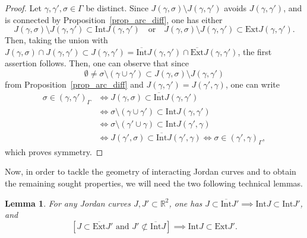 \documentclass[a4paper, 11pt]{article} %
\theoremstyle{plain}
\newtheorem{lemma}[theorem]{Lemma}
\newcommand{\Int}{\mathrm{Int}}
\newcommand{\clInt}{\overline{\mathrm{Int}}}
\newcommand{\Ext}{\mathrm{Ext}}
\newcommand{\clExt}{\overline{\mathrm{Ext}}}
\newcommand{\R}{\mathbb{R}}
\newcommand{\1}{\mathds 1}
\numberwithin{equation}{section}
\begin{document}
\begin{proof}
    Let $\gamma,\gamma',\sigma\in\Gamma$ be distinct. Since $J(\gamma,\sigma)\setminus J(\gamma,\gamma')$ avoids $J(\gamma,\gamma')$, and is connected by Proposition~\ref{prop_arc_diff}, one has either
        \[J(\gamma,\sigma)\setminus J(\gamma,\gamma')\subset \Int J(\gamma,\gamma')\quad\text{or}\quad J(\gamma,\sigma)\setminus J(\gamma,\gamma')\subset\Ext J(\gamma,\gamma').\]
    Then, taking the union with $J(\gamma,\sigma)\cap J(\gamma,\gamma')\subset J(\gamma,\gamma')=\clInt J(\gamma,\gamma')\cap \clExt J(\gamma,\gamma')$, the first assertion follows. Then, one can observe that since
        \[\emptyset\neq\sigma\setminus(\gamma\cup\gamma')\subset J(\gamma,\sigma)\setminus J(\gamma,\gamma')\]
    from Proposition~\ref{prop_arc_diff} and $J(\gamma,\gamma')=J(\gamma',\gamma)$, one can write
        \begin{equation*}
            \begin{split}
                \sigma\in(\gamma,\gamma')_\Gamma&\iff J(\gamma,\sigma)\subset\clInt J(\gamma, \gamma')\\
                &\iff \sigma\setminus (\gamma\cup\gamma')\subset\Int J(\gamma,\gamma')\\
                &\iff \sigma\setminus (\gamma'\cup\gamma)\subset\Int J(\gamma',\gamma)\\
                &\iff J(\gamma',\sigma)\subset\clInt J(\gamma', \gamma)
                \iff\sigma\in(\gamma',\gamma)_\Gamma,
            \end{split}
        \end{equation*}
    which proves symmetry.
\end{proof}


Now, in order to tackle the geometry of interacting Jordan curves and to obtain the remaining sought properties, we will need the two following technical lemmas.


\begin{lemma}
    \label{lemma_inclusions_deduction}
    For any Jordan curves $J,J'\subset\R^2$, one has $J\subset\clInt J'\implies\Int J\subset\Int J'$, and
        \[[J\subset\clExt J'\text{ and }J'\not\subset\clInt J]\implies\Int J\subset\Ext J'.\]
\end{lemma}
\end{document}
